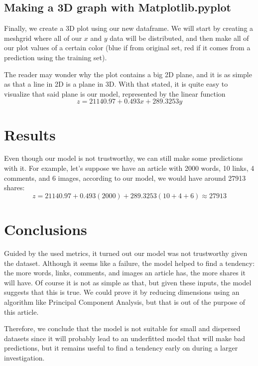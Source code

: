 \documentclass[10pt]{article}
\begin{document}
\subsection{Making a 3D graph with Matplotlib.pyplot}
Finally, we create a 3D plot using our new dataframe. We will start by creating a meshgrid where all of our $x$ and $y$ data will be distributed, and then make all of our plot values of a certain color (blue if from original set, red if it comes from a prediction using the training set). \par

The reader may wonder why the plot contains a big 2D plane, and it is as simple as that a line in 2D is a plane in 3D. With that stated, it is quite easy to visualize that said plane is our model, represented by the linear function
\begin{equation*}
  z = 21140.97 + 0.493x + 289.3253y
\end{equation*}

\section{Results}
Even though our model is not trustworthy, we can still make some predictions with it. For example, let's suppose we have an article with 2000 words, 10 links, 4 comments, and 6 images, according to our model, we would have around 27913 shares:
\begin{equation*}
  z = 21140.97 + 0.493(2000) + 289.3253(10+4+6) \approx 27913
\end{equation*}

\section{Conclusions}
Guided by the used metrics, it turned out our model was not trustworthy given the dataset. Although it seems like a failure, the model helped to find a tendency: the more words, links, comments, and images an article has, the more shares it will have. Of course it is not as simple as that, but given these inputs, the model suggests that this is true. We could prove it by reducing dimensions using an algorithm like Principal Component Analysis, but that is out of the purpose of this article. \par
Therefore, we conclude that the model is not suitable for small and dispersed datasets since it will probably lead to an underfitted model that will make bad predictions, but it remains useful to find a tendency early on during a larger investigation.



\end{document}

